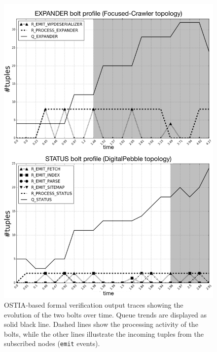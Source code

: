 \begin{figure}
\centering
\includegraphics[width=1\linewidth]{images/verif-traces-bw}
\caption{OSTIA-based formal verification output traces showing the evolution of the two bolts over time. Queue trends are displayed as solid black line. Dashed lines show the processing activity of the bolts, while the other lines illustrate the incoming tuples from the subscribed nodes (\texttt{emit} events).}
\label{verif-trace}
\end{figure}

